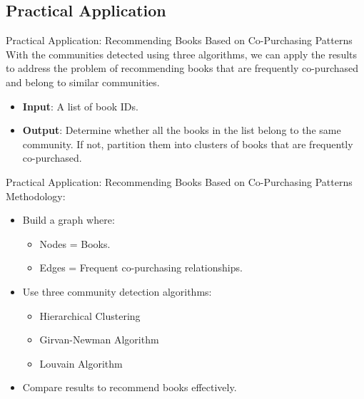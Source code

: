 \documentclass[compress]{beamer}
\begin{document}
\subsection{Practical Application}
\begin{frame}[t]{Practical Application: Recommending Books Based on Co-Purchasing Patterns}
With the communities detected using three algorithms, we can apply the results to address the problem of recommending books that are frequently co-purchased and belong to similar communities.

\begin{itemize}
\item \textbf{Input}: A list of book IDs.
\item \textbf{Output}: Determine whether all the books in the list belong to the same community. If not, partition them into clusters of books that are frequently co-purchased.
\end{itemize}

\end{frame}

\begin{frame}[t]{Practical Application: Recommending Books Based on Co-Purchasing Patterns}
Methodology:

\begin{itemize}
    \item Build a graph where:
    \begin{itemize}
        \item Nodes = Books.
        \item Edges = Frequent co-purchasing relationships.
    \end{itemize}
    \item Use three community detection algorithms:
    \begin{itemize}
        \item Hierarchical Clustering
        \item Girvan-Newman Algorithm
        \item Louvain Algorithm
    \end{itemize}
    \item Compare results to recommend books effectively.
    
\end{itemize}

\end{frame}
\end{document}
